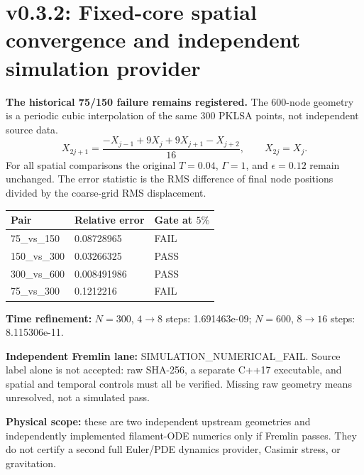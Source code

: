 \documentclass[10pt,a4paper]{article}
\begin{document}
\section{v0.3.2: Fixed-core spatial convergence and independent simulation provider}
\textbf{The historical 75/150 failure remains registered.}
The $600$-node geometry is a periodic cubic interpolation of the same $300$ PKLSA points, not independent source data.
\[
  X_{2j+1}=\frac{-X_{j-1}+9X_j+9X_{j+1}-X_{j+2}}{16},\qquad X_{2j}=X_j.
\]
For all spatial comparisons the original $T=0.04$, $\Gamma=1$, and $\epsilon=0.12$ remain unchanged. The error statistic is the RMS difference of final node positions divided by the coarse-grid RMS displacement.
\begin{center}\begin{tabular}{lll}\toprule
Pair & Relative error & Gate at $5\%$ \\\midrule
75\_vs\_150 & 0.08728965 & FAIL \\
150\_vs\_300 & 0.03266325 & PASS \\
300\_vs\_600 & 0.008491986 & PASS \\
75\_vs\_300 & 0.1212216 & FAIL \\
\bottomrule\end{tabular}\end{center}
\textbf{Time refinement:} $N=300$, $4\to8$ steps: 1.691463e-09; $N=600$, $8\to16$ steps: 8.115306e-11.\par
\textbf{Independent Fremlin lane:} SIMULATION\_NUMERICAL\_FAIL. Source label alone is not accepted: raw SHA-256, a separate C++17 executable, and spatial and temporal controls must all be verified. Missing raw geometry means unresolved, not a simulated pass.\par
\textbf{Physical scope:} these are two independent upstream geometries and independently implemented filament-ODE numerics only if Fremlin passes. They do not certify a second full Euler/PDE dynamics provider, Casimir stress, or gravitation.
\end{document}
